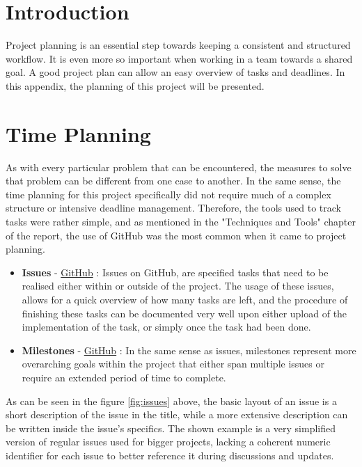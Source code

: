 
\section{Introduction}
Project planning is an essential step towards keeping a consistent and structured workflow. It is even more so important when working in a team towards a shared goal. A good project plan can allow an easy overview of tasks and deadlines. In this appendix, the planning of this project will be presented.
\section{Time Planning}
As with every particular problem that can be encountered, the measures to solve that problem can be different from one case to another. In the same sense, the time planning for this project specifically did not require much of a complex structure or intensive deadline management. Therefore, the tools used to track tasks were rather simple, and as mentioned in the "Techniques and Tools" chapter of the report, the use of GitHub was the most common when it came to project planning.
\begin{itemize}
    \item \textbf{Issues} - \underline{GitHub} : Issues on GitHub, are specified tasks that need to be realised either within or outside of the project. The usage of these issues, allows for a quick overview of how many tasks are left, and the procedure of finishing these tasks can be documented very well upon either upload of the implementation of the task, or simply once the task had been done.
    \item \textbf{Milestones} - \underline{GitHub} : In the same sense as issues, milestones represent more overarching goals within the project that either span multiple issues or require an extended period of time to complete.
\end{itemize}

As can be seen in the figure \ref{fig:issues} above, the basic layout of an issue is a short description of the issue in the title, while a more extensive description can be written inside the issue's specifics. The shown example is a very simplified version of regular issues used for bigger projects, lacking a coherent numeric identifier for each issue to better reference it during discussions and updates.
\pagebreak


